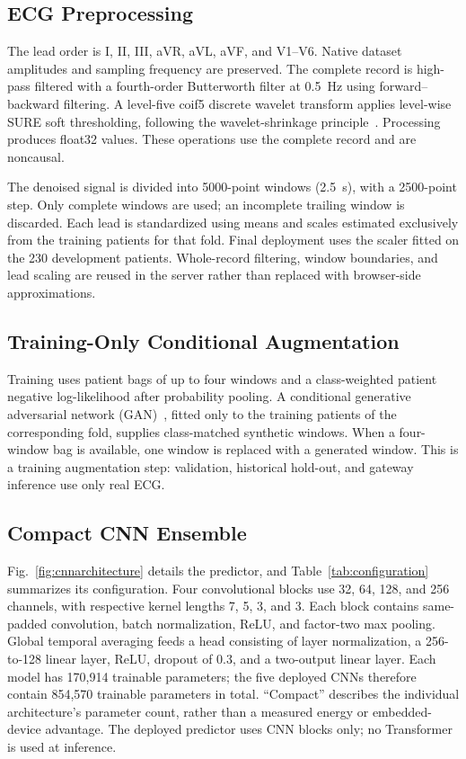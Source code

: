 \documentclass[conference,a4paper]{IEEEtran}
\begin{document}
\subsection{ECG Preprocessing}
The lead order is I, II, III, aVR, aVL, aVF, and V1--V6. Native dataset amplitudes and sampling frequency are preserved. The complete record is high-pass filtered with a fourth-order Butterworth filter at 0.5~Hz using forward--backward filtering. A level-five coif5 discrete wavelet transform applies level-wise SURE soft thresholding, following the wavelet-shrinkage principle~\cite{donoho1995}. Processing produces float32 values. These operations use the complete record and are noncausal.

The denoised signal is divided into 5000-point windows (2.5~s), with a 2500-point step. Only complete windows are used; an incomplete trailing window is discarded. Each lead is standardized using means and scales estimated exclusively from the training patients for that fold. Final deployment uses the scaler fitted on the 230 development patients. Whole-record filtering, window boundaries, and lead scaling are reused in the server rather than replaced with browser-side approximations.

\subsection{Training-Only Conditional Augmentation}
Training uses patient bags of up to four windows and a class-weighted patient negative log-likelihood after probability pooling. A conditional generative adversarial network (GAN)~\cite{mirza2014}, fitted only to the training patients of the corresponding fold, supplies class-matched synthetic windows. When a four-window bag is available, one window is replaced with a generated window. This is a training augmentation step: validation, historical hold-out, and gateway inference use only real ECG.

\subsection{Compact CNN Ensemble}
Fig.~\ref{fig:cnnarchitecture} details the predictor, and Table~\ref{tab:configuration} summarizes its configuration. Four convolutional blocks use 32, 64, 128, and 256 channels, with respective kernel lengths 7, 5, 3, and 3. Each block contains same-padded convolution, batch normalization, ReLU, and factor-two max pooling. Global temporal averaging feeds a head consisting of layer normalization, a 256-to-128 linear layer, ReLU, dropout of 0.3, and a two-output linear layer. Each model has 170,914 trainable parameters; the five deployed CNNs therefore contain 854,570 trainable parameters in total. ``Compact'' describes the individual architecture's parameter count, rather than a measured energy or embedded-device advantage. The deployed predictor uses CNN blocks only; no Transformer is used at inference.
\end{document}
